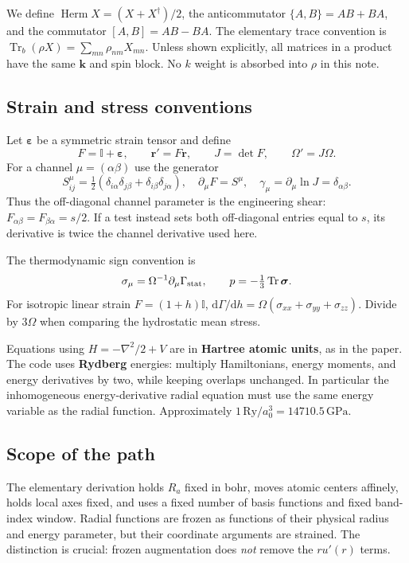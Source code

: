\documentclass[11pt]{article}
\newcommand{\Tr}{\operatorname{Tr}}
\newcommand{\Herm}{\operatorname{Herm}}
\newcommand{\dd}{\mathrm d}
\newcommand{\kb}{\mathbf k}
\newcommand{\Id}{\mathbb I}
\begin{document}
We define $\Herm X=(X+X^\dagger)/2$, the anticommutator
$\{A,B\}=AB+BA$, and the commutator $[A,B]=AB-BA$.
The elementary trace convention is
$\Tr_b(\rho X)=\sum_{mn}\rho_{nm}X_{mn}$.
Unless shown explicitly, all matrices in a product have the same $\kb$
and spin block. No $k$ weight is absorbed into $\rho$ in this note.

\subsection{Strain and stress conventions}
Let $\boldsymbol\varepsilon$ be a symmetric strain tensor and define
\begin{equation}
 F=\Id+\boldsymbol\varepsilon,\qquad
 \mathbf r'=F\mathbf r,\qquad J=\det F,\qquad \Omega'=J\Omega.
\end{equation}
For a channel $\mu=(\alpha\beta)$ use the generator
\begin{equation}
 S^\mu_{ij}=\tfrac12(\delta_{i\alpha}\delta_{j\beta}
                         +\delta_{i\beta}\delta_{j\alpha}),\quad
 \partial_\mu F=S^\mu,\quad
 \gamma_\mu=\partial_\mu\ln J=\delta_{\alpha\beta}.
 \label{eq:strain}
\end{equation}
Thus the off-diagonal channel parameter is the engineering shear:
$F_{\alpha\beta}=F_{\beta\alpha}=s/2$. If a test instead sets both
off-diagonal entries equal to $s$, its derivative is twice the channel
derivative used here.

The thermodynamic sign convention is
\begin{equation}
 \sigma_\mu=\Omega^{-1}\partial_\mu\Gamma_{\rm stat},\qquad
 p=-\tfrac13\Tr\boldsymbol\sigma.
 \label{eq:stress-sign}
\end{equation}
For isotropic linear strain $F=(1+h)\Id$,
$\dd\Gamma/\dd h=\Omega(\sigma_{xx}+\sigma_{yy}+\sigma_{zz})$.
Divide by $3\Omega$ when comparing the hydrostatic mean stress.

Equations using $H=-\nabla^2/2+V$ are in \textbf{Hartree atomic units},
as in the paper. The code uses \textbf{Rydberg} energies: multiply
Hamiltonians, energy moments, and energy derivatives by two, while keeping
overlaps unchanged. In particular the inhomogeneous energy-derivative
radial equation must use the same energy variable as the radial function.
Approximately $1\,\mathrm{Ry}/a_0^3=14710.5\,\mathrm{GPa}$.

\subsection{Scope of the path}
The elementary derivation holds $R_a$ fixed in bohr, moves atomic centers
affinely, holds local axes fixed, and uses a fixed number of basis functions
and fixed band-index window. Radial functions are frozen as functions of
their physical radius and energy parameter, but their coordinate arguments
are strained. The distinction is crucial: frozen augmentation does
\emph{not} remove the $r u'(r)$ terms.
\end{document}
